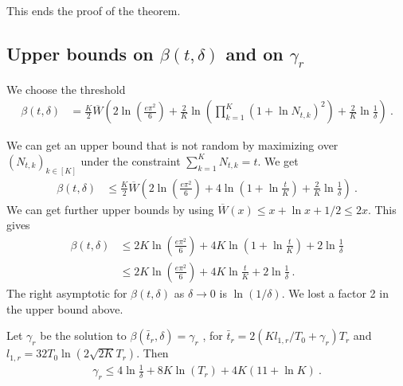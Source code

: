 This ends the proof of the theorem.



\subsection{Upper bounds on $\beta(t, \delta)$ and on $\gamma_r$}

We choose the threshold
\begin{align*}
\beta(t, \delta)
&= \frac{K}{2} \overline{W}\left(2\ln \left(\frac{e\pi^2}{6}\right) + \frac{2}{K}\ln \left(\prod_{k=1}^K (1 + \ln N_{t,k})^2\right) + \frac{2}{K}\ln \frac{1}{\delta}\right)
\: .
\end{align*}

We can get an upper bound that is not random by maximizing over $(N_{t,k})_{k \in [K]}$ under the constraint $\sum_{k=1}^K N_{t,k} = t$. We get
\begin{align*}
\beta(t, \delta)
&\le \frac{K}{2} \overline{W}\left(2\ln \left(\frac{e\pi^2}{6}\right) + 4\ln \left(1 + \ln \frac{t}{K}\right) + \frac{2}{K}\ln \frac{1}{\delta}\right)
\: .
\end{align*}
We can get further upper bounds by using $\overline{W}(x) \le x + \ln x + 1/2 \le 2x$. This gives
\begin{align*}
\beta(t, \delta)
&\le 2 K\ln \left(\frac{e\pi^2}{6}\right) + 4 K\ln \left(1 + \ln \frac{t}{K}\right) + 2\ln \frac{1}{\delta}
\\
&\le 2 K\ln \left(\frac{e\pi^2}{6}\right) + 4 K\ln \frac{t}{K} + 2\ln \frac{1}{\delta}
\: .
\end{align*}
The right asymptotic for $\beta(t, \delta)$ as $\delta \to 0$ is $\ln(1/\delta)$. We lost a factor 2 in the upper bound above.




\begin{lemma}\label{lem:gamma_ub_bis}
Let $\gamma_r$ be the solution to $\beta(\bar{t}_r, \delta) = \gamma_r$ , for $\bar{t}_r = 2(K l_{1,r}/T_0 + \gamma_r) T_r$ and $l_{1,r} = 32 T_0 \ln (2\sqrt{2K} T_r)$. Then
\begin{align*}
\gamma_r \le 4 \ln \frac{1}{\delta} + 8K \ln(T_r) + 4K (11 + \ln K)
\: .
\end{align*}
\end{lemma}

